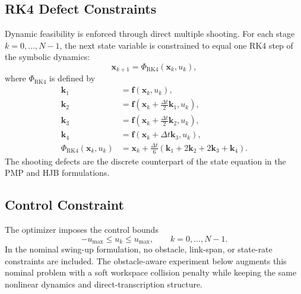 \documentclass[conference]{IEEEtran}
\begin{document}
\subsection{RK4 Defect Constraints}
Dynamic feasibility is enforced through direct multiple shooting. For each stage $k=0,\ldots,N-1$, the next state variable is constrained to equal one RK4 step of the symbolic dynamics:
\begin{equation}
\bm{x}_{k+1} = \Phi_{\mathrm{RK4}}(\bm{x}_k,u_k),
\label{eq:defect}
\end{equation}
where $\Phi_{\mathrm{RK4}}$ is defined by
\begin{align}
\bm{k}_1 &= \bm{f}(\bm{x}_k,u_k), \\
\bm{k}_2 &= \bm{f}\!\left(\bm{x}_k+\frac{\Delta t}{2}\bm{k}_1,u_k\right), \\
\bm{k}_3 &= \bm{f}\!\left(\bm{x}_k+\frac{\Delta t}{2}\bm{k}_2,u_k\right), \\
\bm{k}_4 &= \bm{f}\!\left(\bm{x}_k+\Delta t \bm{k}_3,u_k\right), \\
\Phi_{\mathrm{RK4}}(\bm{x}_k,u_k) &= \bm{x}_k + \frac{\Delta t}{6}\left(\bm{k}_1 + 2\bm{k}_2 + 2\bm{k}_3 + \bm{k}_4\right).
\end{align}
The shooting defects are the discrete counterpart of the state equation in the PMP and HJB formulations.

\subsection{Control Constraint}
The optimizer imposes the control bounds
\begin{equation}
-u_{\max} \le u_k \le u_{\max}, \qquad k=0,\ldots,N-1.
\end{equation}
In the nominal swing-up formulation, no obstacle, link-span, or state-rate constraints are included. The obstacle-aware experiment below augments this nominal problem with a soft workspace collision penalty while keeping the same nonlinear dynamics and direct-transcription structure.
\end{document}
